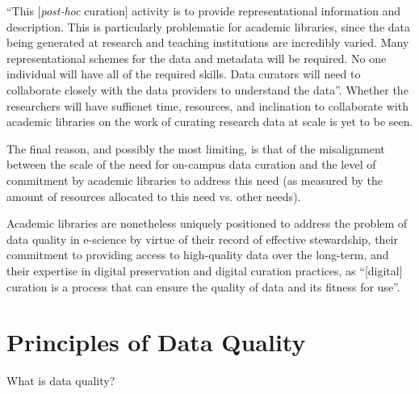 \documentclass{acm_proc_article-sp}
\begin{document}
``This [\textit{post-hoc} curation] activity is to provide
representational information and description. This is particularly
problematic for academic libraries, since the data being generated at
research and teaching institutions are incredibly varied. Many
representational schemes for the data and metadata will be
required. No one individual will have all of the required skills. Data
curators will need to collaborate closely with the data providers to
understand the data''\cite{heidorn:libraries}. Whether the researchers
will have sufficnet time, resources, and inclination to collaborate
with academic libraries on the work of curating research data at scale
is yet to be seen.

The final reason, and possibly the most limiting, is that of the
misalignment between the scale of the need for on-campus data curation
and the level of commitment by academic libraries to address this
need (as measured by the amount of resources allocated to this need
vs. other needs).

Academic libraries are nonetheless uniquely positioned to address the
problem of data quality in e-science by virtue of their record of
effective stewardship, their commitment to providing access to
high-quality data over the long-term, and their expertise in digital
preservation and digital curation practices, as ``[digital] curation is a
process that can ensure the quality of data and its fitness for
use''\cite{curry:community}.

%

\section{Principles of Data Quality}
What is data quality?
\end{document}
